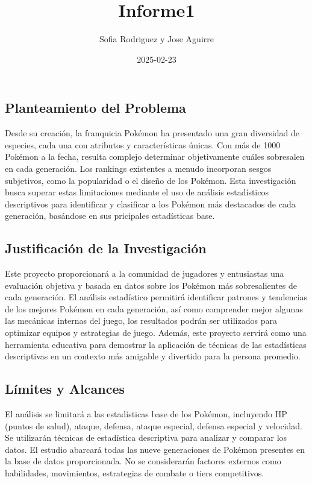 \documentclass[
]{article}
\title{Informe1}
\author{Sofia Rodriguez y Jose Aguirre}
\date{2025-02-23}
\begin{document}
\maketitle

\subsection{Planteamiento del
Problema}\label{planteamiento-del-problema}

Desde su creación, la franquicia Pokémon ha presentado una gran
diversidad de especies, cada una con atributos y características únicas.
Con más de 1000 Pokémon a la fecha, resulta complejo determinar
objetivamente cuáles sobresalen en cada generación. Los rankings
existentes a menudo incorporan sesgos subjetivos, como la popularidad o
el diseño de los Pokémon. Esta investigación busca superar estas
limitaciones mediante el uso de análisis estadísticos descriptivos para
identificar y clasificar a los Pokémon más destacados de cada
generación, basándose en sus pricipales estadísticas base.

\subsection{Justificación de la
Investigación}\label{justificaciuxf3n-de-la-investigaciuxf3n}

Este proyecto proporcionará a la comunidad de jugadores y entusiastas
una evaluación objetiva y basada en datos sobre los Pokémon más
sobresalientes de cada generación. El análisis estadístico permitirá
identificar patrones y tendencias de los mejores Pokémon en cada
generación, así como comprender mejor algunas las mecánicas internas del
juego, los resultados podrán ser utilizados para optimizar equipos y
estrategias de juego. Además, este proyecto servirá como una herramienta
educativa para demostrar la aplicación de técnicas de las estadísticas
descriptivas en un contexto más amigable y divertido para la persona
promedio.

\subsection{Límites y Alcances}\label{luxedmites-y-alcances}

El análisis se limitará a las estadísticas base de los Pokémon,
incluyendo HP (puntos de salud), ataque, defensa, ataque especial,
defensa especial y velocidad. Se utilizarán técnicas de estadística
descriptiva para analizar y comparar los datos. El estudio abarcará
todas las nueve generaciones de Pokémon presentes en la base de datos
proporcionada. No se considerarán factores externos como habilidades,
movimientos, estrategias de combate o tiers competitivos.
\end{document}
